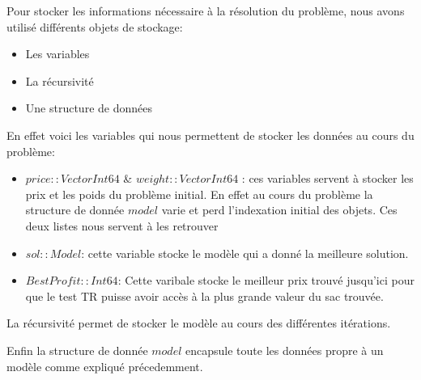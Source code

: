 Pour stocker les informations nécessaire à la résolution du problème, nous avons utilisé différents objets de stockage:
\begin{itemize}
\item Les variables
\item La récursivité
\item Une structure de données
\end{itemize}

En effet voici les variables qui nous permettent de stocker les données au cours du problème:
\begin{itemize}
\item $price::Vector{Int64}$ & $weight::Vector{Int64}$ : ces variables servent à stocker les prix et les poids du problème initial. En effet au cours du problème la structure de donnée $model$ varie et perd l'indexation initial des objets. Ces deux listes nous servent à les retrouver
\item $sol::Model$: cette variable stocke le modèle qui a donné la meilleure solution.
\item $BestProfit::Int64$: Cette varibale stocke le meilleur prix trouvé jusqu'ici pour que le test TR puisse avoir accès à la plus grande valeur du sac trouvée.
\end{itemize}

La récursivité permet de stocker le modèle au cours des différentes itérations.

Enfin la structure de donnée $model$ encapsule toute les données propre à un modèle comme expliqué précedemment.




